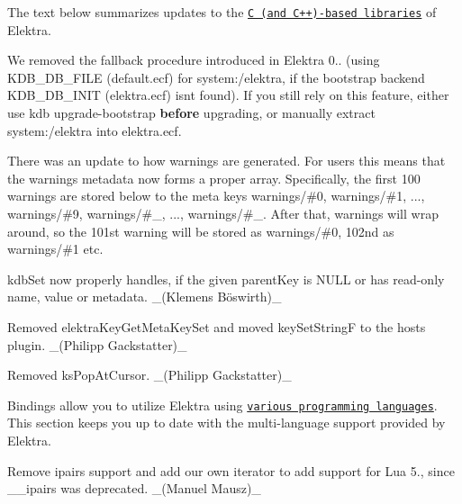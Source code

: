 The text below summarizes updates to the \href{https://www.libelektra.org/libraries/readme}{\tt C (and C++)-\/based libraries} of Elektra.


\begin{DoxyItemize}
\item We removed the fallback procedure introduced in Elektra 0.. (using {\ttfamily K\+D\+B\+\_\+\+D\+B\+\_\+\+F\+I\+LE} ({\ttfamily default.\+ecf}) for {\ttfamily system\+:/elektra}, if the bootstrap backend {\ttfamily K\+D\+B\+\_\+\+D\+B\+\_\+\+I\+N\+IT} ({\ttfamily elektra.\+ecf}) isn\textquotesingle{}t found). If you still rely on this feature, either use {\ttfamily kdb upgrade-\/bootstrap} {\bfseries before} upgrading, or manually extract {\ttfamily system\+:/elektra} into {\ttfamily elektra.\+ecf}.
\item There was an update to how warnings are generated. For users this means that the {\ttfamily warnings} metadata now forms a proper array. Specifically, the first 100 warnings are stored below to the meta keys {\ttfamily warnings/\#0}, {\ttfamily warnings/\#1}, ..., {\ttfamily warnings/\#9}, {\ttfamily warnings/\#\+\_}, ..., {\ttfamily warnings/\#\+\_}. After that, warnings will wrap around, so the 101st warning will be stored as {\ttfamily warnings/\#0}, 102nd as {\ttfamily warnings/\#1} etc.
\end{DoxyItemize}


\begin{DoxyItemize}
\item {\ttfamily kdb\+Set} now properly handles, if the given {\ttfamily parent\+Key} is {\ttfamily N\+U\+LL} or has read-\/only name, value or metadata. \+\_\+(Klemens Böswirth)\+\_\+
\end{DoxyItemize}


\begin{DoxyItemize}
\item Removed {\ttfamily elektra\+Key\+Get\+Meta\+Key\+Set} and moved {\ttfamily key\+Set\+StringF} to the hosts plugin. \+\_\+(\+Philipp Gackstatter)\+\_\+
\item Removed {\ttfamily ks\+Pop\+At\+Cursor}. \+\_\+(\+Philipp Gackstatter)\+\_\+
\end{DoxyItemize}

Bindings allow you to utilize Elektra using \href{https://www.libelektra.org/bindings/readme}{\tt various programming languages}. This section keeps you up to date with the multi-\/language support provided by Elektra.


\begin{DoxyItemize}
\item Remove ipairs support and add our own iterator to add support for Lua 5., since {\ttfamily \+\_\+\+\_\+ipairs} was deprecated. \+\_\+(\+Manuel Mausz)\+\_\+
\end{DoxyItemize}


